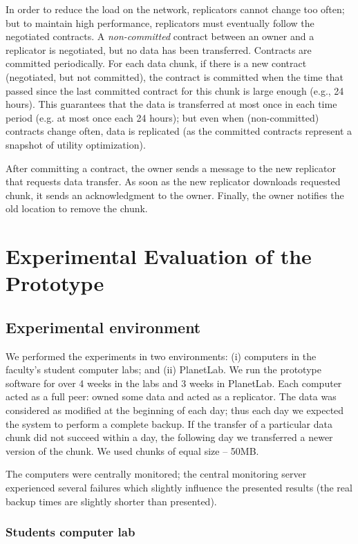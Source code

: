 \documentclass[10pt, final, conference, letterpaper]{IEEEtran}
\begin{document}
In order to reduce the load on the network, replicators cannot change too often; but to maintain high performance, replicators must eventually follow the negotiated contracts. A \emph{non-committed} contract between an owner and a replicator is negotiated, but no data has been transferred. Contracts are committed periodically. For each data chunk, if there is a new contract (negotiated, but not committed), the contract is committed when the time that passed since the last committed contract for this chunk is large enough (e.g., 24 hours). This guarantees that the data is transferred at most once in each time period (e.g. at most once each 24 hours); but even when (non-committed) contracts change often, data is replicated (as the committed contracts represent a snapshot of utility optimization).

After committing a contract, the owner sends a message to the new replicator that requests data transfer. As soon as the new replicator downloads requested chunk, it sends an acknowledgment to the owner. Finally, the owner notifies the old location to remove the chunk.


\section{Experimental Evaluation of the Prototype}\label{sec::experiments}

\subsection{Experimental environment}

We performed the experiments in two environments: (i) computers in the faculty's student computer labs; and (ii) PlanetLab. We run the prototype software for over 4 weeks in the labs and 3 weeks in PlanetLab. Each computer acted as a full peer: owned some data and acted as a replicator. The data was considered as modified at the beginning of each day; thus each day we expected the system to perform a complete backup. If the transfer of a particular data chunk did not succeed within a day, the following day we transferred a newer version of the chunk. We used chunks of equal size -- 50MB.

The computers were centrally monitored; the central monitoring server experienced several failures which slightly influence the presented results (the real backup times are  slightly shorter than presented).

\subsubsection{Students computer lab}
\end{document}

